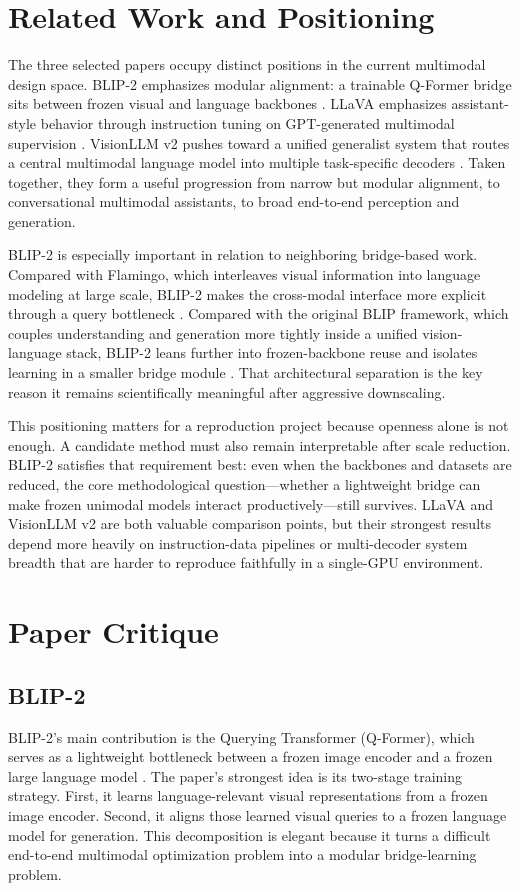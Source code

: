 \documentclass[11pt]{article}
\begin{document}
\section{Related Work and Positioning}
The three selected papers occupy distinct positions in the current multimodal design space. BLIP-2 emphasizes modular alignment: a trainable Q-Former bridge sits between frozen visual and language backbones \citep{li2023blip2}. LLaVA emphasizes assistant-style behavior through instruction tuning on GPT-generated multimodal supervision \citep{liu2023visual}. VisionLLM v2 pushes toward a unified generalist system that routes a central multimodal language model into multiple task-specific decoders \citep{wu2024visionllmv2}. Taken together, they form a useful progression from narrow but modular alignment, to conversational multimodal assistants, to broad end-to-end perception and generation.

BLIP-2 is especially important in relation to neighboring bridge-based work. Compared with Flamingo, which interleaves visual information into language modeling at large scale, BLIP-2 makes the cross-modal interface more explicit through a query bottleneck \citep{alayrac2022flamingo}. Compared with the original BLIP framework, which couples understanding and generation more tightly inside a unified vision-language stack, BLIP-2 leans further into frozen-backbone reuse and isolates learning in a smaller bridge module \citep{li2022blip}. That architectural separation is the key reason it remains scientifically meaningful after aggressive downscaling.

This positioning matters for a reproduction project because openness alone is not enough. A candidate method must also remain interpretable after scale reduction. BLIP-2 satisfies that requirement best: even when the backbones and datasets are reduced, the core methodological question---whether a lightweight bridge can make frozen unimodal models interact productively---still survives. LLaVA and VisionLLM v2 are both valuable comparison points, but their strongest results depend more heavily on instruction-data pipelines or multi-decoder system breadth that are harder to reproduce faithfully in a single-GPU environment.

\section{Paper Critique}
\subsection{BLIP-2}
BLIP-2's main contribution is the Querying Transformer (Q-Former), which serves as a lightweight bottleneck between a frozen image encoder and a frozen large language model \citep{li2023blip2}. The paper's strongest idea is its two-stage training strategy. First, it learns language-relevant visual representations from a frozen image encoder. Second, it aligns those learned visual queries to a frozen language model for generation. This decomposition is elegant because it turns a difficult end-to-end multimodal optimization problem into a modular bridge-learning problem.
\end{document}
